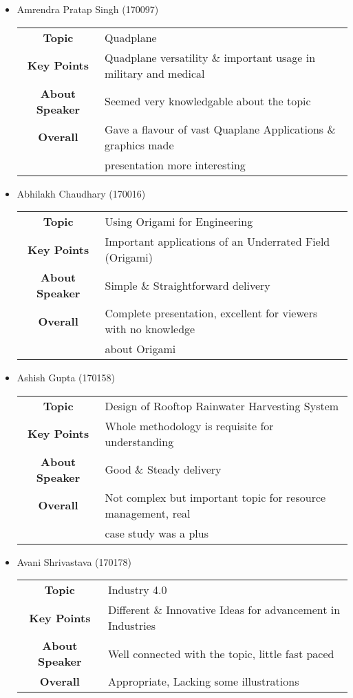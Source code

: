 \documentclass[12pt]{article}
\begin{document}
\begin{itemize}
		\item Amrendra Pratap Singh (170097)\\
		\begin{tabular}{c l}
			\textbf{Topic} & Quadplane\\
			\textbf{Key Points} & Quadplane versatility \& important usage in military and medical\\
			\textbf{About Speaker} & Seemed very knowledgable about the topic\\
			\textbf{Overall} & Gave a flavour of vast Quaplane Applications \& graphics made\\ & presentation more interesting\\
		\end{tabular}
	
		\item Abhilakh Chaudhary (170016)\\
		\begin{tabular}{c l}
			\textbf{Topic} & Using Origami for Engineering\\
			\textbf{Key Points} & Important applications of an Underrated Field (Origami)\\
			\textbf{About Speaker} & Simple \& Straightforward delivery\\
			\textbf{Overall} & Complete presentation, excellent for viewers with no knowledge \\ & about Origami\\
		\end{tabular}
	
		\item Ashish Gupta (170158)\\
		\begin{tabular}{c l}
			\textbf{Topic} & Design of Rooftop Rainwater Harvesting System\\
			\textbf{Key Points} & Whole methodology is requisite for understanding\\
			\textbf{About Speaker} & Good \& Steady delivery\\
			\textbf{Overall} & Not complex but important topic for resource management, real\\ & case study was a plus\\
		\end{tabular}
	
		\item Avani Shrivastava (170178)\\
		\begin{tabular}{c l}
			\textbf{Topic} & Industry 4.0\\
			\textbf{Key Points} & Different \& Innovative Ideas for advancement in Industries\\
			\textbf{About Speaker} & Well connected with the topic, little fast paced\\
			\textbf{Overall} & Appropriate, Lacking some illustrations\\
		\end{tabular}
		
	\end{itemize}
\end{document}
